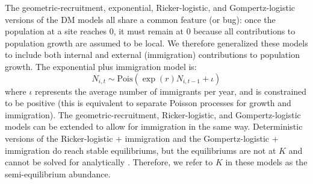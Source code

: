 \documentclass[12pt]{article}
\begin{document}
The geometric-recruitment, exponential, Ricker-logistic, and Gompertz-logistic
versions of the DM models all share a common feature (or bug):
once the population at a site reaches 0, it must remain at 0
because all contributions to population growth are assumed to be
local.  We therefore generalized these models to
include both internal and external (immigration) contributions
to population growth.  The exponential plus immigration
model is:
\begin{equation}
  N_{i,t} \sim \mathrm{Pois}(\exp(r)N_{i,t-1} + \iota)
  \label{eq:expimm2}
\end{equation}
where $\iota$ represents the average number of immigrants per year, and is
constrained to be
positive (this is equivalent to separate Poisson processes for
growth and immigration).  %
The geometric-recruitment, Ricker-logistic,
and Gompertz-logistic models can be extended to allow for immigration in the
same way.   Deterministic versions of the Ricker-logistic + immigration and the 
Gompertz-logistic + immigration do reach stable equilibriums, but the equilibriums 
are not at $K$ and cannot be solved for analytically \citep{otto_day:2007}.  Therefore, we
refer to $K$ in these models as the semi-equilibrium abundance.

\end{document}
